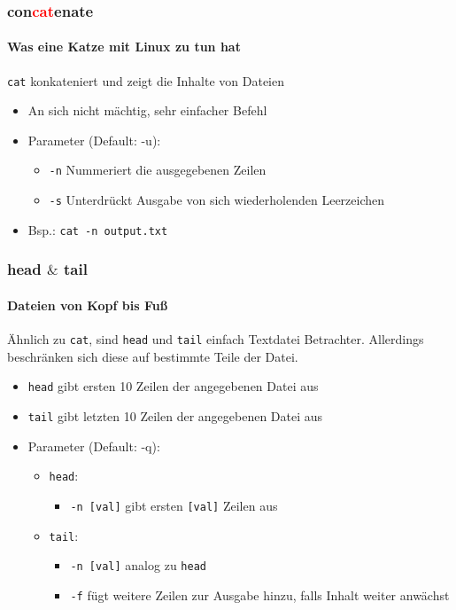 \documentclass[12pt,utf8]{beamer}
\begin{document}
\begin{frame}
\frametitle{con\textcolor{red}{cat}enate}
\framesubtitle{\textcolor{ownDarkOr}{Was eine Katze mit Linux zu tun hat}}
\texttt{cat} konkateniert und zeigt die Inhalte von Dateien
\begin{itemize}
	\item An sich nicht mächtig, sehr einfacher Befehl
	\item Parameter (Default: -u):
	\begin{itemize}[<+->]
		\item \texttt{-n} Nummeriert die ausgegebenen Zeilen 
		\item \texttt{-s} Unterdrückt Ausgabe von sich wiederholenden Leerzeichen
	\end{itemize}
	\item Bsp.: \texttt{cat -n output.txt}
\end{itemize}
\end{frame}

\begin{frame}
\frametitle{head $\&$ tail}
\framesubtitle{\textcolor{ownDarkOr}{Dateien von Kopf bis Fuß}}
Ähnlich zu \texttt{cat}, sind \texttt{head} und \texttt{tail} einfach Textdatei Betrachter. Allerdings beschränken sich diese auf bestimmte Teile der Datei.
\begin{itemize}
	\item \texttt{head} gibt ersten 10 Zeilen der angegebenen Datei aus
	\item \texttt{tail} gibt letzten 10 Zeilen der angegebenen Datei aus
	\item Parameter (Default: -q):
	\begin{itemize}
		\item \texttt{head}:
		\begin{itemize}[<+->]
			\item {\scriptsize \texttt{-n [val]} gibt ersten \texttt{[val]} Zeilen aus }
		\end{itemize}
		\item \texttt{tail}:
		\begin{itemize}[<+->]
			\item {\scriptsize \texttt{-n [val]} analog zu \texttt{head}}
			\item {\scriptsize \texttt{-f} fügt weitere Zeilen zur Ausgabe hinzu, falls Inhalt weiter anwächst}
		\end{itemize}
	\end{itemize}
\end{itemize}
\end{frame}
\end{document}
